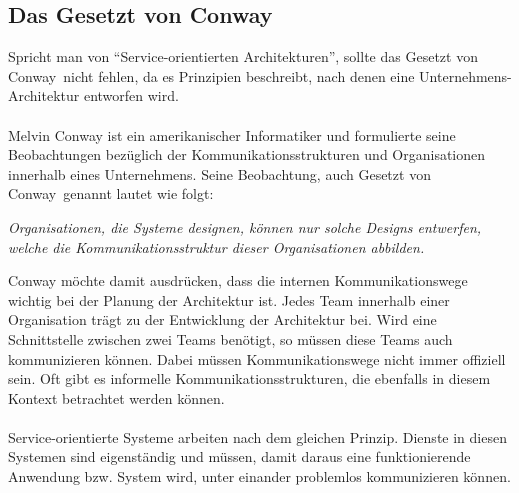 \subsection{Das Gesetzt von Conway}
\label{subsec:conway}
Spricht man von "`Service-orientierten Architekturen"', sollte das \glqq Gesetzt von Conway\grqq\ nicht fehlen, da es Prinzipien beschreibt, nach denen eine Unternehmens-Architektur entworfen wird.
\\\\
Melvin Conway ist ein amerikanischer Informatiker und formulierte seine Beobachtungen bezüglich der Kommunikationsstrukturen und Organisationen innerhalb eines Unternehmens. Seine Beobachtung, auch \glqq Gesetzt von Conway\grqq\ genannt lautet wie folgt:
\begin{center}
    \textit{Organisationen, die Systeme designen, können nur solche Designs entwerfen, welche die Kommunikationsstruktur dieser Organisationen abbilden.}
\end{center}

Conway möchte damit ausdrücken, dass die internen Kommunikationswege wichtig bei der Planung der Architektur ist. Jedes Team innerhalb einer Organisation trägt zu der Entwicklung der Architektur bei. Wird eine Schnittstelle zwischen zwei Teams benötigt, so müssen diese Teams auch kommunizieren können. Dabei müssen Kommunikationswege nicht immer offiziell sein. Oft gibt es informelle Kommunikationsstrukturen, die ebenfalls in diesem Kontext betrachtet werden können.
\\\\
Service-orientierte Systeme arbeiten nach dem gleichen Prinzip. Dienste in diesen Systemen sind eigenständig und müssen, damit daraus eine funktionierende Anwendung bzw. System wird, unter einander problemlos kommunizieren können.

